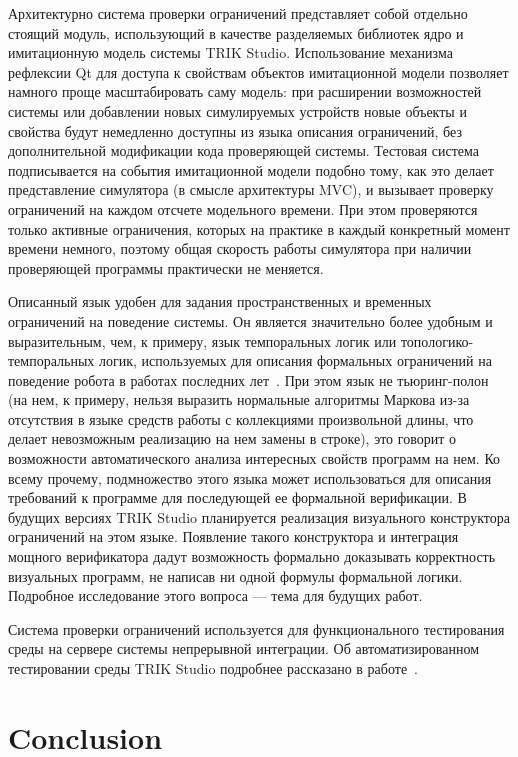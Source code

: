 \documentclass[conference]{IEEEtran}
\begin{document}
Архитектурно система проверки ограничений представляет собой отдельно стоящий модуль, использующий в качестве разделяемых библиотек ядро и имитационную модель системы TRIK Studio. Использование механизма рефлексии Qt для доступа к свойствам объектов имитационной модели позволяет намного проще масштабировать саму модель: при расширении возможностей системы или добавлении новых симулируемых устройств новые объекты и свойства будут немедленно доступны из языка описания ограничений, без дополнительной модификации кода проверяющей системы. Тестовая система подписывается на события имитационной модели подобно тому, как это делает представление симулятора (в смысле архитектуры MVC), и вызывает проверку ограничений на каждом отсчете модельного времени. При этом проверяются только активные ограничения, которых на практике в каждый конкретный момент времени немного, поэтому общая скорость работы симулятора при наличии проверяющей программы практически не меняется.

Описанный язык удобен для задания пространственных и временных ограничений на поведение системы. Он является значительно более удобным и выразительным, чем, к примеру, язык темпоральных логик или топологико-темпоральных логик, используемых для описания формальных ограничений на поведение робота в работах последних лет~\cite{mordvinov2016formal,kress2007s,бугайченко2007разработка,дмитриев2013адаптация}. При этом язык не тьюринг-полон (на нем, к примеру, нельзя выразить нормальные алгоритмы Маркова из-за отсутствия в языке средств работы с коллекциями произвольной длины, что делает невозможным реализацию на нем замены в строке), это говорит о возможности автоматического анализа интересных свойств программ на нем. Ко всему прочему, подмножество этого языка может использоваться для описания требований к программе для последующей ее формальной верификации. В будущих версиях TRIK Studio планируется реализация визуального конструктора ограничений на этом языке. Появление такого конструктора и интеграция мощного верификатора дадут возможность формально доказывать корректность визуальных программ, не написав ни одной формулы формальной логики. Подробное исследование этого вопроса --- тема для будущих работ.

Система проверки ограничений используется для функционального тестирования среды на сервере системы непрерывной интеграции. Об автоматизированном тестировании среды TRIK Studio подробнее рассказано в работе~\cite{mordvinov2016testing}.

\section*{Conclusion}
\label{chapter:conclusion}
\end{document}
